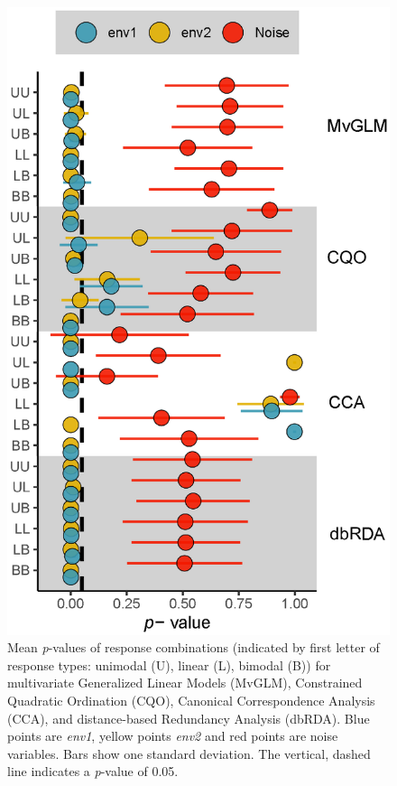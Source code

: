 \documentclass[a4paper,11pt]{article}
\begin{document}
    \begin{figure}
        \centering
        \includegraphics[scale = 0.7]{figure4_mean_p_vlaues}
        \caption{
        Mean \textit{p}-values of response combinations (indicated by first letter of response types: unimodal (U), linear (L), bimodal (B)) for multivariate Generalized Linear Models (MvGLM), Constrained Quadratic Ordination (CQO), Canonical Correspondence Analysis (CCA), and distance-based Redundancy Analysis (dbRDA). Blue points are \textit{env1}, yellow points \textit{env2} and red points are noise variables. Bars show one standard deviation. The vertical, dashed line indicates a \textit{p}-value of 0.05.
        }
        \label{fig:result1::p-valueComparison}
    \end{figure}
    
\end{document}
